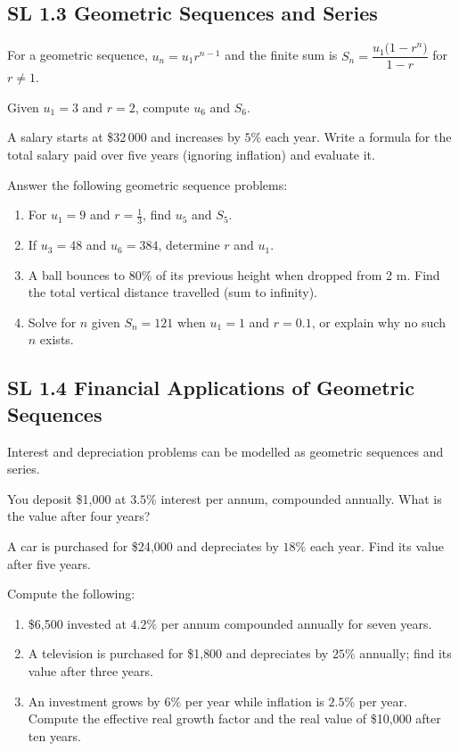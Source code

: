 \documentclass[11pt]{article}
\def\SI#1#2{#1 #2}%
\newcommand{\tocsubsection}[1]{\subsection{#1}}
\newcounter{question}
\begin{document}
\tocsubsection{SL  1.3  \; Geometric  Sequences  and  Series}
For a geometric sequence, $u_n=u_1r^{n-1}$ and the finite sum is
$S_n=\dfrac{u_1\bigl(1-r^{n}\bigr)}{1-r}$ for $r\neq1$.

\begin{question}
Given $u_1=3$ and $r=2$, compute $u_6$ and $S_6$.
\end{question}

\begin{question}
A salary starts at \$32\,000 and increases by $5\%$ each year.  Write a formula
for the total salary paid over five years (ignoring inflation) and evaluate it.
\end{question}

\begin{question}
Answer the following geometric sequence problems:
\begin{enumerate}[label=\alph*)]
\item For $u_1=9$ and $r=\tfrac{1}{3}$, find $u_5$ and $S_5$.
\item If $u_3=48$ and $u_6=384$, determine $r$ and $u_1$.
\item A ball bounces to $80\%$ of its previous height when dropped from
\SI{2}{m}.  Find the total vertical distance travelled (sum to infinity).
\item Solve for $n$ given $S_n=121$ when $u_1=1$ and $r=0.1$, or explain why no such $n$ exists.
\end{enumerate}
\end{question}

\tocsubsection{SL  1.4  \; Financial  Applications  of  Geometric  Sequences}
Interest and depreciation problems can be modelled as geometric sequences and
series.

\begin{question}
You deposit \$1{,}000 at $3.5\%$ interest per annum, compounded annually.  What
is the value after four years?
\end{question}

\begin{question}
A car is purchased for \$24{,}000 and depreciates by $18\%$ each year.  Find
its value after five years.
\end{question}

\begin{question}
Compute the following:
\begin{enumerate}[label=\alph*)]
\item \$6{,}500 invested at $4.2\%$ per annum compounded annually for seven years.
\item A television is purchased for \$1{,}800 and depreciates by $25\%$ annually;
find its value after three years.
\item An investment grows by $6\%$ per year while inflation is $2.5\%$ per
year.  Compute the effective real growth factor and the real value of
\$10{,}000 after ten years.
\end{enumerate}
\end{question}
\end{document}
